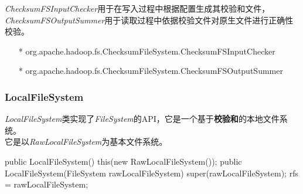         \textit{ChecksumFSInputChecker}用于在写入过程中根据配置生成其校验和文件，\textit{ChecksumFSOutputSummer}用于读取过程中依据校验文件对原生文件进行正确性校验。
        \begin{itemize}
            \item[*] org.apache.hadoop.fs.ChecksumFileSystem.ChecksumFSInputChecker      
            \item[*] org.apache.hadoop.fs.ChecksumFileSystem.ChecksumFSOutputSummer
        \end{itemize}

    \subsubsection{LocalFileSystem}
        \textit{LocalFileSystem}类实现了\textit{FileSystem}的API，它是一个基于\textbf{校验和}的本地文件系统。\\
        它是以\textit{RawLocalFileSystem}为基本文件系统。
        \begin{java}[caption=LocalFileSystem]
public LocalFileSystem() {  
    this(new RawLocalFileSystem());  
}  
public LocalFileSystem(FileSystem rawLocalFileSystem) {  
    super(rawLocalFileSystem);  
    rfs = rawLocalFileSystem;  
} 
        \end{java}
        
